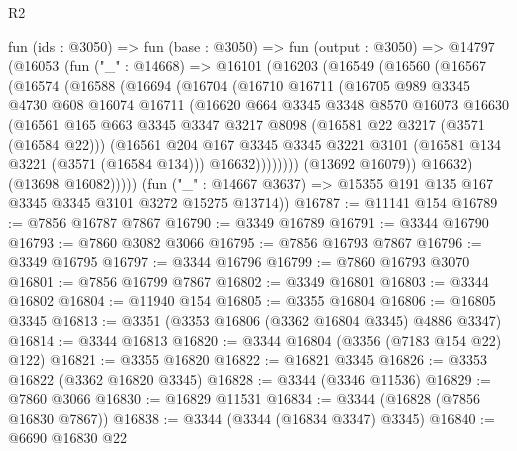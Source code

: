 \begin{lexlean}{R2}
\begin{coremodule}
  fun (ids : @3050) =>
  fun (base : @3050) =>
  fun (output : @3050) =>
  @14797
    (@16053
      (fun ("_" : @14668) =>
      @16101
        (@16203
          (@16549
            (@16560
              (@16567
                (@16574
                  (@16588
                    (@16694
                      (@16704
                        (@16710
                          @16711
                          (@16705
                            @989
                            @3345
                            @4730
                            @608
                            @16074
                            @16711
                            (@16620
                              @664
                              @3345
                              @3348
                              @8570
                              @16073
                              @16630
                              (@16561
                                @165
                                @663
                                @3345
                                @3347
                                @3217
                                @8098
                                (@16581 @22 @3217 (@3571 (@16584 @22)))
                                (@16561
                                  @204
                                  @167
                                  @3345
                                  @3345
                                  @3221
                                  @3101
                                  (@16581 @134 @3221 (@3571 (@16584 @134)))
                                  @16632))))))))
                  (@13692 @16079))
                @16632)
              (@13698 @16082)))))
      (fun ("_" : @14667 @3637) => @15355 @191 @135 @167 @3345 @3345 @3101 @3272 @15275 @13714))
@16787 := @11141 @154
@16789 := @7856 @16787 @7867
@16790 := @3349 @16789
@16791 := @3344 @16790
@16793 := @7860 @3082 @3066
@16795 := @7856 @16793 @7867
@16796 := @3349 @16795
@16797 := @3344 @16796
@16799 := @7860 @16793 @3070
@16801 := @7856 @16799 @7867
@16802 := @3349 @16801
@16803 := @3344 @16802
@16804 := @11940 @154
@16805 := @3355 @16804
@16806 := @16805 @3345
@16813 := @3351 (@3353 @16806 (@3362 @16804 @3345) @4886 @3347)
@16814 := @3344 @16813
@16820 := @3344 @16804 (@3356 (@7183 @154 @22) @122)
@16821 := @3355 @16820
@16822 := @16821 @3345
@16826 := @3353 @16822 (@3362 @16820 @3345)
@16828 := @3344 (@3346 @11536)
@16829 := @7860 @3066
@16830 := @16829 @11531
@16834 := @3344 (@16828 (@7856 @16830 @7867))
@16838 := @3344 (@3344 (@16834 @3347) @3345)
@16840 := @6690 @16830 @22

\end{coremodule}
\end{lexlean}
